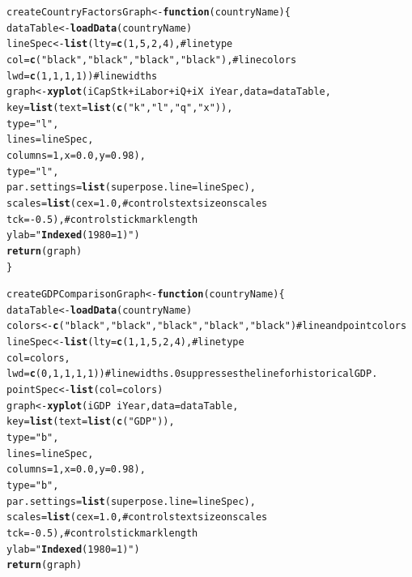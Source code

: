 \documentclass[preprint,authoryear,12pt]{elsarticle}\usepackage{graphicx, color}
\makeatletter
\newcommand{\hlfunctioncall}[1]{\textcolor[rgb]{0.501960784313725,0,0.329411764705882}{\textbf{#1}}}%
\newcommand{\hlstring}[1]{\textcolor[rgb]{0.6,0.6,1}{#1}}%
\newcommand{\hlcomment}[1]{\textcolor[rgb]{0.180392156862745,0.6,0.341176470588235}{#1}}%
\newenvironment{kframe}{%
 \def\at@end@of@kframe{}%
 \ifinner\ifhmode%
  \def\at@end@of@kframe{\end{minipage}}%
  \begin{minipage}{\columnwidth}%
 \fi\fi%
 \def\FrameCommand##1{\hskip\@totalleftmargin \hskip-\fboxsep
 \colorbox{shadecolor}{##1}\hskip-\fboxsep
     \hskip-\linewidth \hskip-\@totalleftmargin \hskip\columnwidth}%
 \MakeFramed {\advance\hsize-\width
   \@totalleftmargin\z@ \linewidth\hsize
   \@setminipage}}%
 {\par\unskip\endMakeFramed%
 \at@end@of@kframe}
\newenvironment{knitrout}{}{} %
\makeatother
\begin{document}
\begin{knitrout}
\color{fgcolor}\begin{kframe}
\begin{alltt}

createCountryFactorsGraph <- \hlfunctioncall{function}(countryName)\{
  dataTable <- \hlfunctioncall{loadData}(countryName)
  lineSpec <- \hlfunctioncall{list}(lty=\hlfunctioncall{c}(1, 5, 2, 4), \hlcomment{#line type}
                   col=\hlfunctioncall{c}(\hlstring{"black"}, \hlstring{"black"}, \hlstring{"black"}, \hlstring{"black"}), #line colors
                   lwd=\hlfunctioncall{c}(1, 1, 1, 1)) \hlcomment{#line widths}
  graph <- \hlfunctioncall{xyplot}(iCapStk+iLabor+iQ+iX ~ iYear, data=dataTable,
                  key=\hlfunctioncall{list}(text=\hlfunctioncall{list}(\hlfunctioncall{c}(\hlstring{"k"}, \hlstring{"l"}, \hlstring{"q"}, \hlstring{"x"})),
                           type=\hlstring{"l"},
                           lines=lineSpec,
                           columns=1, x=0.0, y=0.98),
                  type=\hlstring{"l"},
                  par.settings = \hlfunctioncall{list}(superpose.line = lineSpec),
                  scales=\hlfunctioncall{list}(cex=1.0, \hlcomment{#controls text size on scales}
                              tck=-0.5), \hlcomment{#controls tick mark length}
                  ylab=\hlstring{"\hlfunctioncall{Indexed} (1980=1)"})
  \hlfunctioncall{return}(graph)
\}

createGDPComparisonGraph <- \hlfunctioncall{function}(countryName)\{
  dataTable <- \hlfunctioncall{loadData}(countryName)
  colors <- \hlfunctioncall{c}(\hlstring{"black"}, \hlstring{"black"}, \hlstring{"black"}, \hlstring{"black"}, \hlstring{"black"}) #line and point colors
  lineSpec <- \hlfunctioncall{list}(lty=\hlfunctioncall{c}(1, 1, 5, 2, 4), \hlcomment{#line type}
                   col=colors,
                   lwd=\hlfunctioncall{c}(0, 1, 1, 1, 1)) \hlcomment{#line widths. 0 suppresses the line for historical GDP.}
  pointSpec <- \hlfunctioncall{list}(col=colors)
  graph <- \hlfunctioncall{xyplot}(iGDP ~ iYear, data=dataTable,
                  key=\hlfunctioncall{list}(text=\hlfunctioncall{list}(\hlfunctioncall{c}(\hlstring{"GDP"})),
                           type=\hlstring{"b"},
                           lines=lineSpec,
                           columns=1, x=0.0, y=0.98),
                  type=\hlstring{"b"},
                  par.settings = \hlfunctioncall{list}(superpose.line = lineSpec),
                  scales=\hlfunctioncall{list}(cex=1.0, \hlcomment{#controls text size on scales}
                              tck=-0.5), \hlcomment{#controls tick mark length}
                  ylab=\hlstring{"\hlfunctioncall{Indexed} (1980=1)"})
  \hlfunctioncall{return}(graph)


\end{alltt}
\end{kframe}
\end{knitrout}
\end{document}
